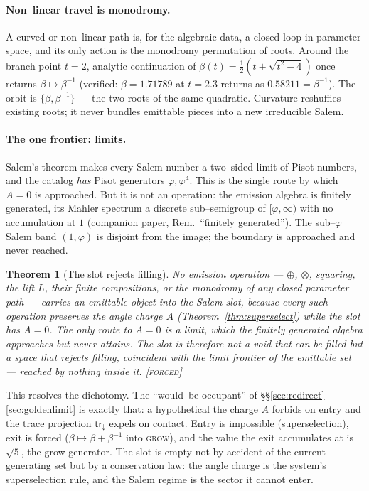 \documentclass[11pt]{article}
\theoremstyle{plain}
\newtheorem{theorem}{Theorem}[section]
\theoremstyle{definition}
\theoremstyle{remark}
\newcommand{\forced}{\textcolor{forcedc}{\textsc{[forced]}}}
\newcommand{\trace}{\mathsf{tr}_{\!\downarrow}}
\begin{document}
\paragraph{Non--linear travel is monodromy.} A curved or non--linear path is, for the algebraic data, a closed loop in parameter space, and its only action is the monodromy permutation of roots. Around the branch point $t=2$, analytic continuation of $\beta(t)=\tfrac12(t+\sqrt{t^2-4})$ once returns $\beta\mapsto\beta^{-1}$ (verified: $\beta=1.71789$ at $t=2.3$ returns as $0.58211=\beta^{-1}$). The orbit is $\{\beta,\beta^{-1}\}$ --- the two roots of the same quadratic. Curvature reshuffles existing roots; it never bundles emittable pieces into a new irreducible Salem.

\paragraph{The one frontier: limits.} Salem's theorem makes every Salem number a two--sided limit of Pisot numbers, and the catalog \emph{has} Pisot generators $\varphi,\varphi^4$. This is the single route by which $A=0$ is approached. But it is not an operation: the emission algebra is finitely generated, its Mahler spectrum a discrete sub--semigroup of $[\varphi,\infty)$ with no accumulation at $1$ (companion paper, Rem.~``finitely generated''). The sub--$\varphi$ Salem band $(1,\varphi)$ is disjoint from the image; the boundary is approached and never reached.

\begin{theorem}[The slot rejects filling]\label{thm:rejects}
No emission operation --- $\oplus$, $\otimes$, squaring, the lift $L$, their finite compositions, or the monodromy of any closed parameter path --- carries an emittable object into the Salem slot, because every such operation preserves the angle charge $A$ (Theorem~\ref{thm:superselect}) while the slot has $A=0$. The only route to $A=0$ is a limit, which the finitely generated algebra approaches but never attains. The slot is therefore not a void that can be filled but a \emph{space that rejects filling}, coincident with the limit frontier of the emittable set --- reached by nothing inside it. \forced
\end{theorem}

This resolves the dichotomy. The ``would--be occupant'' of \S\S\ref{sec:redirect}--\ref{sec:goldenlimit} is exactly that: a hypothetical the charge $A$ forbids on entry and the trace projection $\trace$ expels on contact. Entry is impossible (superselection), exit is forced ($\beta\mapsto\beta+\beta^{-1}$ into \textsc{grow}), and the value the exit accumulates at is $\sqrt5$, the grow generator. The slot is empty not by accident of the current generating set but by a conservation law: the angle charge is the system's superselection rule, and the Salem regime is the sector it cannot enter.
\end{document}

